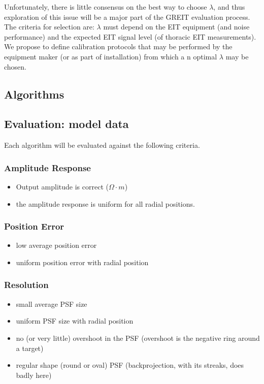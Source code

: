 \documentclass[letterpaper,twocolumn,11pt]{article}
\begin{document}
\begin{list}{\bf {}.}
Unfortunately, there is little consensus on the best
way to choose $\lambda$, and thus exploration of 
this issue will be a major part of the GREIT evaluation
process. The criteria for selection are:
$\lambda$ must depend on the EIT equipment (and noise
performance) and the expected EIT signal level (of
thoracic EIT measurements). We propose to define
calibration protocols that may be performed by the 
equipment maker (or as part of installation) from which
a n optimal $\lambda$ may be chosen.

\end{list}


\subsection{Algorithms}
\subsection{Evaluation: model data}

Each algorithm will be evaluated against the
following criteria.

\subsubsection{Amplitude Response}
   \begin{itemize}
   \item Output amplitude is correct ($\Omega \cdot m$)
   \item the amplitude response is uniform for all radial positions.
   \end{itemize}

\subsubsection{Position Error}
   \begin{itemize}
   \item low average position error
   \item uniform position error with radial position
   \end{itemize}

\subsubsection{ Resolution}
   \begin{itemize}
   \item small average PSF size
   \item uniform PSF size with radial position
   \item no (or very little) overshoot in the PSF
  (overshoot is the negative ring around a target)
   \item regular shape (round or oval) PSF
  (backprojection, with its streaks, does badly here)
   \end{itemize}
\end{document}

